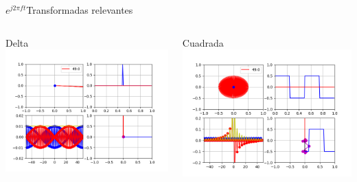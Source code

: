 \begin{frame}{$e^{j2\pi ft}$}{Transformadas relevantes}
   \begin{columns}[c]
      \begin{column}{.5\textwidth}
         Delta
         \centering\includegraphics[width=1.0\textwidth]{3_clase/euler_delta}
      \end{column}
      \begin{column}{.5\textwidth}
         Cuadrada
         \centering\includegraphics[width=1.0\textwidth]{3_clase/euler_cuadrada}
      \end{column}
   \end{columns}
   \vfill
\end{frame}
